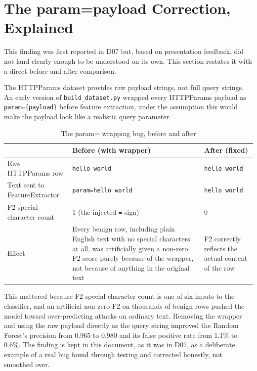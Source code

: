 \documentclass{llncs}
\begin{document}
\clearpage
\section{The param={payload} Correction, Explained}
\label{sec:param}

This finding was first reported in D07 but, based on presentation
feedback, did not land clearly enough to be understood on its own. This
section restates it with a direct before-and-after comparison.

The HTTPParams dataset provides raw payload strings, not full query
strings. An early version of \texttt{build\_dataset.py} wrapped every
HTTPParams payload as \texttt{param=\{payload\}} before feature
extraction, under the assumption this would make the payload look like
a realistic query parameter.

\begin{table}[h]
\centering
\caption{The param= wrapping bug, before and after}
\begin{tabular}{p{}p{}p{}}
\toprule
& \textbf{Before (with wrapper)} & \textbf{After (fixed)} \\
\midrule
Raw HTTPParams row & \texttt{hello world} & \texttt{hello world} \\
Text sent to FeatureExtractor & \texttt{param=hello world} & \texttt{hello world} \\
F2 special character count & 1 (the injected \texttt{=} sign) & 0 \\
Effect & Every benign row, including plain English text with no
special characters at all, was artificially given a non-zero F2
score purely because of the wrapper, not because of anything in the
original text & F2 correctly reflects the actual content of the row \\
\bottomrule
\end{tabular}
\end{table}

This mattered because F2 special character count is one of six inputs
to the classifier, and an artificial non-zero F2 on thousands of benign
rows pushed the model toward over-predicting attacks on ordinary text.
Removing the wrapper and using the raw payload directly as the query
string improved the Random Forest's precision from 0.965 to 0.980 and
its false positive rate from 1.1\% to 0.6\%. The finding is kept in this
document, as it was in D07, as a deliberate example of a real bug found
through testing and corrected honestly, not smoothed over.
\end{document}
